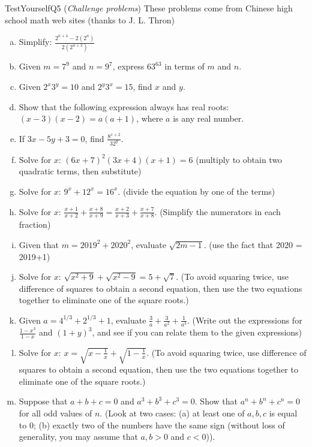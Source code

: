 \begin{exercise}{TestYourselfQ5}
(\emph{Challenge problems})  These problems come from Chinese high school math web sites (thanks to J. L. Thron)
\begin{enumerate}[(a)]
\item
Simplify: $\frac{2^{n+4} - 2(2^n)}{2(2^{n+3})}$
\item
Given $m = 7^9$ and $n=9^7$, express $63^{63}$ in terms of $m$ and $n$.
\item
Given $2^x3^y = 10$ and $2^y3^x = 15$, find $x$ and $y$.
\item
Show that the following expression always has real roots:  $(x-3)(x-2) = a(a+1)$, where $a$ is any real number.
\item
If $3x-5y+3=0$, find $\displaystyle \frac{8^{x+2}}{32^y}$.
\item
Solve for $x$:  $(6x+7)^2(3x+4)(x+1) = 6$  (multiply to obtain two quadratic terms, then substitute)
\item
Solve for $x$: $9^x + 12^x=16^x$.  (divide the equation by one of the terms)
\item
Solve for $x$:  $\frac{x+1}{x+2} + \frac{x+8}{x+9} =\frac{x+2}{x+3} + \frac{x+7}{x+8}$. (Simplify the numerators in each fraction)
\item
Given that $m=2019^2 + 2020^2$, evaluate $\sqrt{2m-1}$. (use the fact that 2020 = 2019+1)
\item
Solve for $x$: $\sqrt{x^2 + 9} + \sqrt{x^2-9} = 5 + \sqrt{7}$. (To avoid squaring twice, use difference of squares to obtain a second equation, then use the two equations together to eliminate one of the square roots.)
\item
Given $a = 4^{1/3} + 2^{1/3} + 1$, evaluate $\frac{3}{a} + \frac{3}{a^2} + \frac{1}{a^3}$. (Write out the expressions for  
$\frac{1 - x^3}{1-x}$ and $(1+y)^3$, and see if you can relate them to the given expressions)
\item
Solve for $x$: $x = \sqrt{x - \frac{1}{x}} + \sqrt{1 - \frac{1}{x}}$.  (To avoid squaring twice, use difference of squares to obtain a second equation, then use the two equations together to eliminate one of the square roots.)
\item
Suppose that $a+b+c=0$ and $a^3 + b^3 + c^3=0$.  Show that $a^n + b^n + c^n = 0$ for all odd values of $n$. (Look at two cases:  (a) at least one of $a,b,c$ is equal to 0; (b) exactly two of the numbers have the same sign (without loss of generality, you may assume that $a,b>0$ and $c<0$)).

\end{enumerate}
\end{exercise}
